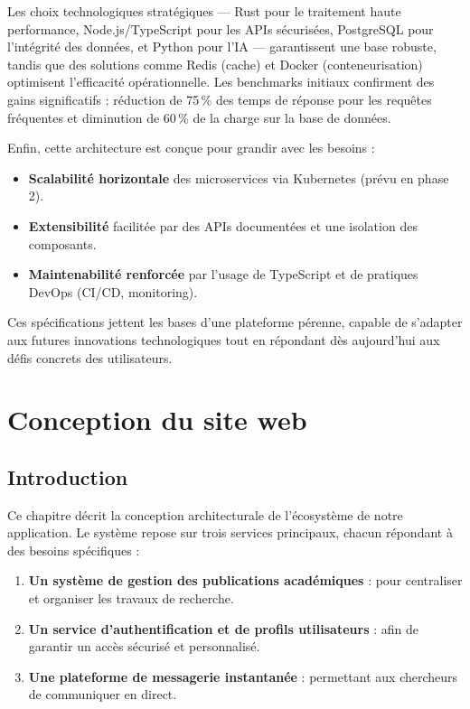 \documentclass{rapportPfe}
\begin{document}
Les choix technologiques stratégiques — Rust pour le traitement haute performance, Node.js/TypeScript pour les APIs sécurisées, PostgreSQL pour l’intégrité des données, et Python pour l’IA — garantissent une base robuste, tandis que des solutions comme Redis (cache) et Docker (conteneurisation) optimisent l’efficacité opérationnelle. Les benchmarks initiaux confirment des gains significatifs : réduction de 75\,\% des temps de réponse pour les requêtes fréquentes et diminution de 60\,\% de la charge sur la base de données.

Enfin, cette architecture est conçue pour grandir avec les besoins :

\begin{itemize}
    \item \textbf{Scalabilité horizontale} des microservices via Kubernetes (prévu en phase 2).
    \item \textbf{Extensibilité} facilitée par des APIs documentées et une isolation des composants.
    \item \textbf{Maintenabilité renforcée} par l’usage de TypeScript et de pratiques DevOps (CI/CD, monitoring).
\end{itemize}

Ces spécifications jettent les bases d’une plateforme pérenne, capable de s’adapter aux futures innovations technologiques tout en répondant dès aujourd’hui aux défis concrets des utilisateurs.

\chapter{Conception du site web}

\section{Introduction}

Ce chapitre décrit la conception architecturale de l'écosystème de notre application. Le système repose sur trois services principaux, chacun répondant à des besoins spécifiques :

\begin{enumerate}
    \item \textbf{Un système de gestion des publications académiques} : pour centraliser et organiser les travaux de recherche.
    
    \item \textbf{Un service d’authentification et de profils utilisateurs} : afin de garantir un accès sécurisé et personnalisé.
    
    \item \textbf{Une plateforme de messagerie instantanée} : permettant aux chercheurs de communiquer en direct.
    
\end{enumerate}
\end{document}

